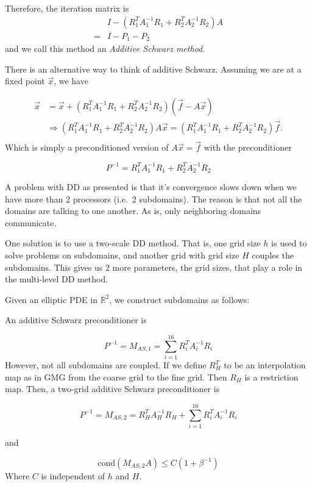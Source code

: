 Therefore, the iteration matrix is
\begin{align*}
    &I - \left(R_1^T A_1^{-1} R_1 + R_2^T A_2^{-1} R_2\right)A\\
    = &I -P_1-P_2
\end{align*}
and we call this method an \emph{Additive Schwarz method}.

There is an alternative way to think of additive Schwarz. Assuming we are at a fixed point $\vec{x}$, we have 


\begin{align*}
    \vec{x} &= \vec{x}+
    \left(R_1^T A_1^{-1} R_1 + R_2^T A_2^{-1} R_2\right)
    \left(\vec{f} - A\vec{x}\right)\\
    &\Rightarrow\left(R_1^T A_1^{-1} R_1 + R_2^T A_2^{-1} R_2\right)
    A\vec{x} = \left(R_1^T A_1^{-1} R_1 + R_2^T A_2^{-1} R_2\right)\vec{f}.\\
\end{align*}
Which is simply a preconditioned version of $A\vec{x} = \vec{f}$ with the preconditioner

\begin{equation*}
    P^{-1} = R_1^T A_1^{-1} R_1 + R_2^T A_2^{-1} R_2
\end{equation*}


A problem with DD as presented is that it's convergence slows down when we have more than 2 processors (i.e.\ 2 subdomains). The reason is that not all the domains are talking to one another. As is, only neighboring domains communicate.

One solution is to use a two-scale DD method. That is, one grid size $h$ is used to solve problems on subdomains, and another grid with grid size $H$ couples the subdomains. This gives us 2 more parameters, the grid sizes, that play a role in the multi-level DD method.

Given an elliptic PDE in $\mathbb{R}^2$, we construct subdomains as follows:

\begin{center}
    
\end{center}

An additive Schwarz preconditioner is

\begin{equation*}
    P^{-1} = M_{AS, 1} = \sum_{i=1}^{16} R_i^TA_i^{-1}R_i
\end{equation*}
However, not all subdomains are coupled. If we define $R_H^T$ to be an interpolation map as in GMG from the coarse grid to the fine grid. Then $R_H$ is a restriction map. Then, a two-grid additive Schwarz preconditioner is

\begin{equation*}
    P^{-1} = M_{AS, 2} = R_H^TA_H^{-1}R_H+\sum_{i=1}^{16} R_i^TA_i^{-1}R_i
\end{equation*}

and

\begin{equation*}
    \text{cond}(M_{AS, 2}A) \leq C (1+\beta^{-1})
\end{equation*}
Where $C$ is independent of $h$ and $H$.


